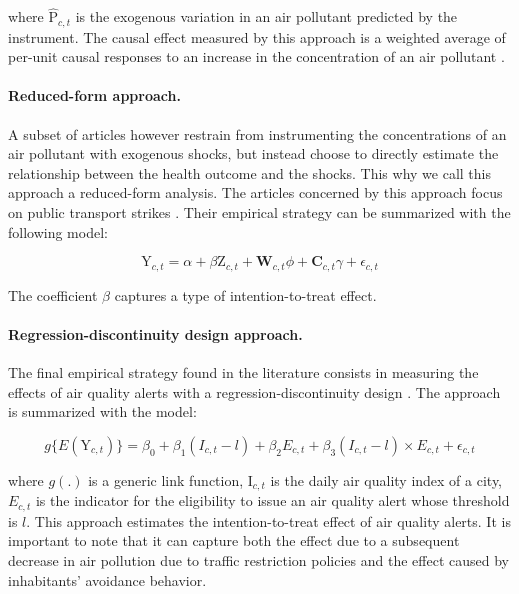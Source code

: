 \documentclass[12pt]{article}
\begin{document}
        \noindent where $\widehat{\text{P}}_{c,t}$ is the exogenous variation in an air pollutant predicted by the instrument. The causal effect measured by this approach is a weighted average of per-unit causal responses to an increase in the concentration of an air pollutant \citep{angrist1995two}.

        \paragraph{Reduced-form approach.} A subset of articles however restrain from instrumenting the concentrations of an air pollutant with exogenous shocks, but instead choose to directly estimate the relationship between the health outcome and the shocks. This why we call this approach a reduced-form analysis. The articles concerned by this approach focus on public transport strikes \citep{bauernschuster_when_2017, godzinski2019short, giaccherini2021particulate}. Their empirical strategy can be summarized with the following model:
        
        \begin{equation*}
        \text{Y}_{c,t} = \alpha + \beta\text{Z}_{c,t} + \textbf{W}_{c,t}\phi + \textbf{C}_{c,t}\gamma + \epsilon_{c,t}
        \end{equation*}
        
        \noindent The coefficient $\beta$ captures a type of intention-to-treat effect.
        
        \paragraph{Regression-discontinuity design approach.} The final empirical strategy found in the literature consists in measuring the effects of air quality alerts with a regression-discontinuity design \citep{chen_effect_2018}. The approach is summarized with the model:
        
        \begin{equation*}
        g\{E(\text{Y}_{c,t})\} = \beta_{0} + \beta_{1}(I_{c,t}-l) + \beta_{2}E_{c,t} + \beta_{3}(I_{c,t}-l)\times E_{c,t} + \epsilon_{c,t}
        \end{equation*}
        
        \noindent where $g(.)$ is a generic link function, I$_{c,t}$ is the daily air quality index of a city, $E_{c,t}$ is the indicator for the eligibility to issue an air quality alert whose threshold is $l$. This approach estimates the intention-to-treat effect of air quality alerts. It is important to note that it can capture both the effect due to a subsequent decrease in air pollution due to traffic restriction policies and the effect caused by inhabitants' avoidance behavior.
        
\end{document}
